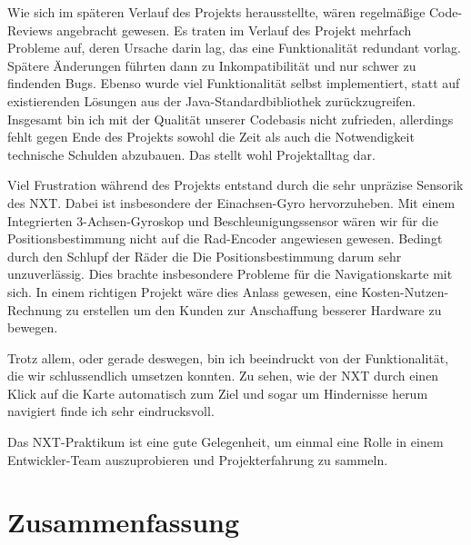 \documentclass[oneside,abstractoff,a4paper]{scrartcl}
\begin{document}
Wie sich im späteren Verlauf des Projekts herausstellte, wären regelmäßige Code-Reviews angebracht gewesen.  Es traten im Verlauf des Projekt mehrfach Probleme auf, deren Ursache darin lag, das eine Funktionalität redundant vorlag. Spätere Änderungen führten dann zu Inkompatibilität und nur schwer zu findenden Bugs.
Ebenso wurde viel Funktionalität selbst implementiert, statt auf existierenden Lösungen aus der Java-Standardbibliothek zurückzugreifen. Insgesamt bin ich mit der Qualität unserer Codebasis nicht zufrieden, allerdings fehlt gegen Ende des Projekts sowohl die Zeit als auch die Notwendigkeit technische Schulden abzubauen. Das stellt wohl Projektalltag dar.

Viel Frustration während des Projekts entstand durch die sehr unpräzise Sensorik des NXT. Dabei ist insbesondere der Einachsen-Gyro hervorzuheben. Mit einem Integrierten 3-Achsen-Gyroskop und Beschleunigungssensor wären wir für die Positionsbestimmung nicht auf die Rad-Encoder angewiesen gewesen. Bedingt durch den Schlupf der Räder die Die Positionsbestimmung darum sehr unzuverlässig. Dies brachte insbesondere Probleme für die Navigationskarte mit sich. In einem richtigen Projekt wäre dies Anlass gewesen, eine Kosten-Nutzen-Rechnung zu erstellen um den Kunden zur Anschaffung besserer Hardware zu bewegen.

Trotz allem, oder gerade deswegen, bin ich beeindruckt von der Funktionalität, die wir schlussendlich umsetzen konnten. Zu sehen, wie der NXT durch einen Klick auf die Karte automatisch zum Ziel und sogar um Hindernisse herum navigiert finde ich sehr eindrucksvoll.

Das NXT-Praktikum ist eine gute Gelegenheit, um einmal eine Rolle in einem Entwickler-Team auszuprobieren und Projekterfahrung zu sammeln.

\section{Zusammenfassung}
\end{document}
